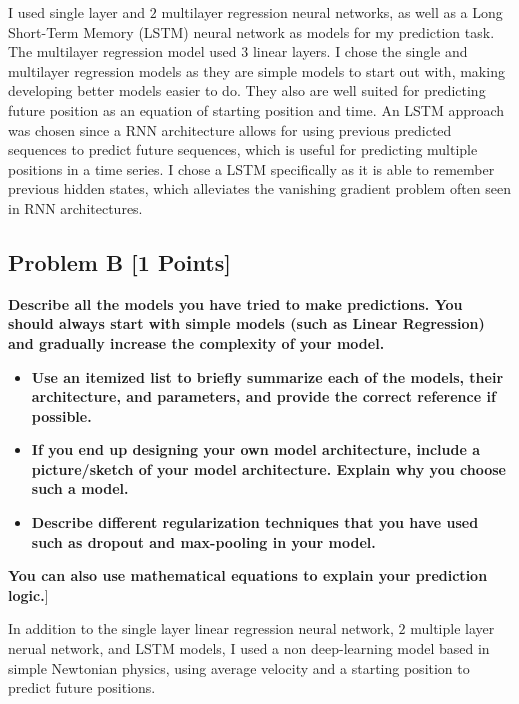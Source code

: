 \documentclass{article}
\begin{document}
      I used single layer and $2$ multilayer regression neural networks, as well as a Long Short-Term Memory (LSTM) neural network as models for my prediction task.
      The multilayer regression model used $3$ linear layers. I chose the single and multilayer regression models as they are simple models
      to start out with, making developing better models easier to do. They also are well suited for predicting future position as an equation of 
      starting position and time. An LSTM approach was chosen since a RNN architecture allows for using previous predicted sequences
      to predict future sequences, which is useful for predicting multiple positions in a time series. I chose a LSTM specifically as it 
      is able to remember previous hidden states, which alleviates the vanishing gradient problem often seen in RNN architectures.

    \subsection{Problem B [1 Points]}        
      \textbf{Describe all the models you have tried to make predictions. You
      should always start with simple models (such as Linear Regression) and gradually 
      increase the complexity of your model.}
 
      \begin{itemize}
        \item \textbf{Use an itemized list to briefly summarize each of the models, their architecture, and
        parameters, and provide the correct reference if possible.}
        \item \textbf{If you end up designing your own model architecture, include a picture/sketch of
        your model architecture. Explain why you choose such a model.}
        \item \textbf{Describe different regularization techniques that you have used such as dropout
        and max-pooling in your model.}
      \end{itemize}

      \textbf{You can also use mathematical equations to explain your prediction logic.}]

      In addition to the single layer linear regression neural network, $2$ multiple layer nerual network, and LSTM models, I used a 
      non deep-learning model based in simple Newtonian physics, using average velocity and a starting position to predict future 
      positions.
\end{document}
